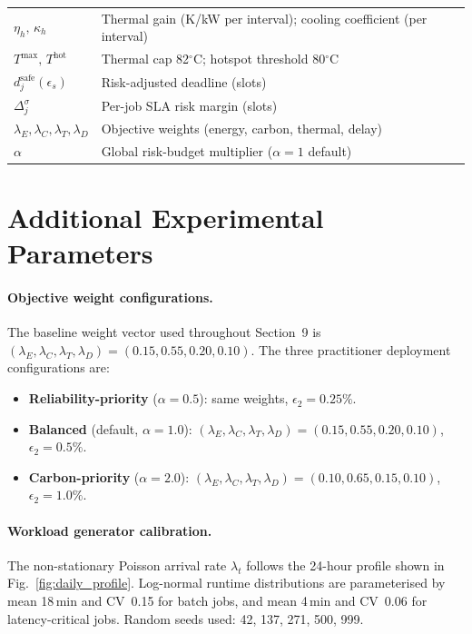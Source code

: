 \documentclass[a4paper,fleqn]{cas-dc}
\begin{document}
\begin{table}[!htb]
\begin{tabular}{>{\bfseries}p{3.2cm} p{5.0cm}}
\rowcolor{black!5}$\eta_h,\,\kappa_h$ & Thermal gain (K/kW per interval); cooling coefficient (per interval) \\
$T^{\max},\,T^{\mathrm{hot}}$ & Thermal cap 82$^\circ$C; hotspot threshold 80$^\circ$C \\
\rowcolor{black!5}$d^{\mathrm{safe}}_j(\epsilon_s)$ & Risk-adjusted deadline (slots) \\
$\Delta^\sigma_j$ & Per-job SLA risk margin (slots) \\
\rowcolor{black!5}$\lambda_E,\lambda_C,\lambda_T,\lambda_D$ & Objective weights (energy, carbon, thermal, delay) \\
$\alpha$ & Global risk-budget multiplier ($\alpha=1$ default) \\
\bottomrule
\end{tabular}
\end{table}

\section{Additional Experimental Parameters}
\label{app:params}

\paragraph{Objective weight configurations.}
The baseline weight vector used throughout Section~9 is $(\lambda_E, \lambda_C, \lambda_T, \lambda_D) = (0.15, 0.55, 0.20, 0.10)$.
The three practitioner deployment configurations are:
\begin{itemize}
  \item \textbf{Reliability-priority} ($\alpha=0.5$): same weights, $\epsilon_2 = 0.25\%$.
  \item \textbf{Balanced} (default, $\alpha=1.0$): $(\lambda_E, \lambda_C, \lambda_T, \lambda_D) = (0.15, 0.55, 0.20, 0.10)$, $\epsilon_2 = 0.5\%$.
  \item \textbf{Carbon-priority} ($\alpha=2.0$): $(\lambda_E, \lambda_C, \lambda_T, \lambda_D) = (0.10, 0.65, 0.15, 0.10)$, $\epsilon_2 = 1.0\%$.
\end{itemize}

\paragraph{Workload generator calibration.}
The non-stationary Poisson arrival rate $\lambda_t$ follows the 24-hour profile shown in Fig.~\ref{fig:daily_profile}. Log-normal runtime distributions are parameterised by mean 18\,min and CV~0.15 for batch jobs, and mean 4\,min and CV~0.06 for latency-critical jobs. Random seeds used: 42, 137, 271, 500, 999.
\end{document}
